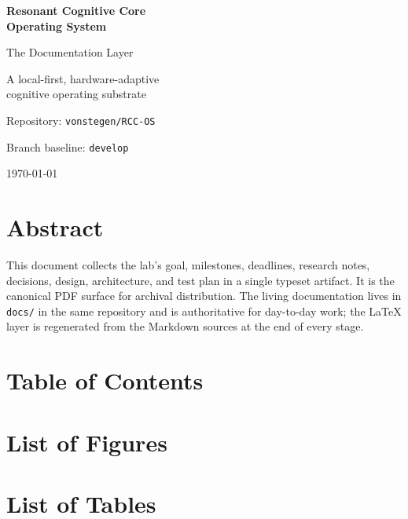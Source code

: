 
\begin{titlepage}
  \centering
  \vspace*{2cm}
  {\Huge\bfseries\color{rccosAccent} Resonant Cognitive Core \\ Operating System\par}
  \vspace{0.5cm}
  {\Large The Documentation Layer\par}
  \vspace{2cm}
  {\large A local-first, hardware-adaptive \\ cognitive operating substrate\par}
  \vspace{1.5cm}
  {\large Repository: \texttt{vonstegen/RCC-OS}\par}
  {\large Branch baseline: \texttt{develop}\par}
  \vspace{1.5cm}
  {\large \today\par}
\end{titlepage}

\section*{Abstract}

This document collects the lab's goal, milestones, deadlines, research
notes, decisions, design, architecture, and test plan in a single
typeset artifact. It is the canonical PDF surface for archival
distribution. The living documentation lives in
\texttt{docs/} in the same repository and is authoritative for day-to-day
work; the LaTeX layer is regenerated from the Markdown sources at the
end of every stage.

\section*{Table of Contents}
\tableofcontents

\section*{List of Figures}
\listoffigures

\section*{List of Tables}
\listoftables
